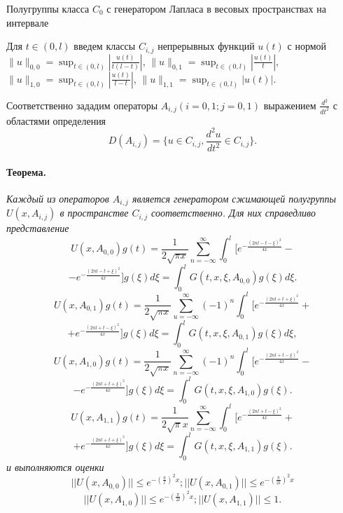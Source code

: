 \vzmstitle
{
	Полугруппы класса $C_0$ с генератором Лапласа в весовых пространствах на интервале
}


\vzmscaption

Для $t\in(0,l)$ введем классы $C_{i,j}$ непрерывных функций $u(t)$ с нормой
$  \|u\|_{0,0}=\sup_{t\in(0,l)} |\frac{u(t)}{t(l-t)}|$, $\|u\|_{0,1}=\sup_{t\in(0,l)} |\frac{u(t)}{t}|$, $\|u\|_{1,0}=\sup_{t\in(0,l)} |\frac{u(t)}{l-t}|$, $\|u\|_{1,1}=\sup_{t\in(0,l)} |u(t)|$.

Соответственно зададим операторы $A_{i, j}(i = 0, 1; j = 0, 1)$
 выражением $\frac{d^2}{dt^2}$ с областями
определения $$D(A_{i, j}) = \{ u \in C_{i, j},
\frac{d^2u}{dt^2} \in C_{i, j} \}.$$
\paragraph{Теорема.} {\it
	Каждый из операторов $A_{i,j}$ является генератором сжимающей полугруппы
$U(x,A_{i,j})$ в пространстве $C_{i,j}$ соответственно. Для них справедливо представление
$$
U(x,A_{0,0})g(t)=\frac{1}{2\sqrt{\pi x}}\sum_{n=-\infty}^{\infty}\int_{0}^{l}[e^{-\frac{(2nl-t-\xi)^2}{4x}}-
$$
$$-e^{-\frac{(2nl-t+\xi)^2}{4x}}]g(\xi)d\xi=\int_{0}^{l}G(t,x,\xi,A_{0,0})g(\xi)d\xi.$$
$$U(x,A_{0,1})g(t)=\frac{1}{2\sqrt{\pi
x}}\sum_{u=-\infty}^{\infty}(-1)^{n}\int_{0}^{l}[e^{-\frac{(2nl+t+\xi)^2}{4x}}+$$ $$+e^{-\frac{(2nl+t-\xi)^2}{4x}}]g(\xi)d\xi=
\int_{0}^{l}G(t,x,\xi,A_{0,1})g(\xi)d\xi,$$
$$U(x,A_{1,0})g(t)=\frac{1}{2\sqrt{\pi x}}\sum_{n=-\infty}^{\infty}(-1)^n\int_{0}^{l}[e^{-\frac{(2nl+t-\xi)^2}{4x}}
-$$ $$- e^{-\frac{(2nl+t+\xi)^2}{4x}}]g(\xi)d\xi=\int_{0}^{l}G(t,x,\xi,A_{1,0})g(\xi).$$ $$
U(x,A_{1,1})g(t)=\frac{1}{2\sqrt{\pi}x}\sum_{n=-\infty}^{\infty}
\int_{0}^{l}[e^{-\frac{(2nl+t-\xi)^2}{4x}}+$$ $$+e^{-\frac{(2nl+t+\xi)^2}{4x}}]g(\xi)d\xi=\int_{0}^{l}G(t,x,\xi,A_{1,1})g(\xi).$$
 и выполняются оценки
 $$
||U(x,A_{0,0})||\leq e^{-(\frac{\pi}{l})^{2}x};||U(x,A_{0,1})||\leq e^{-(\frac{\pi}{2l})^{2}x}$$
$$||U(x,A_{1,0})||\leq e^{-(\frac{\pi}{2l})^{2}x};||U(x,A_{1,1})||\leq
1.$$}



